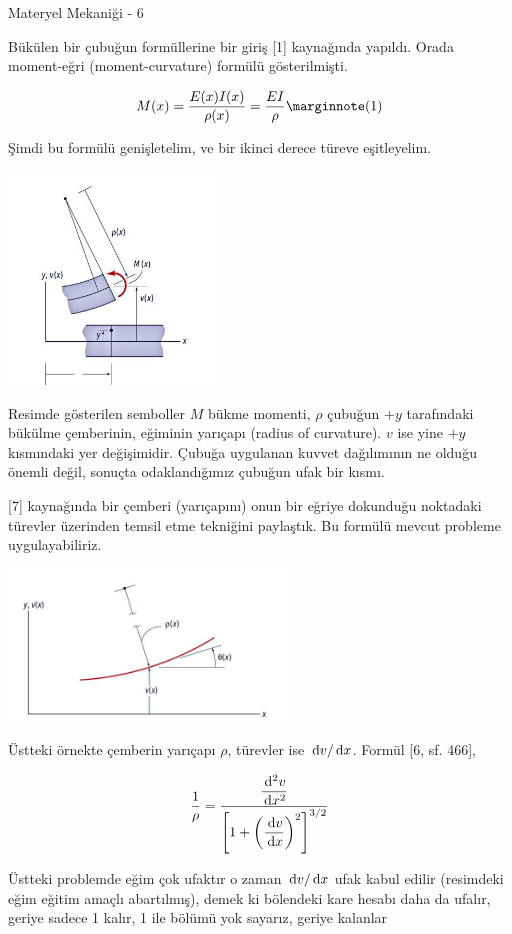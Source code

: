 \documentclass[12pt,fleqn]{article}\usepackage{../../common}
\begin{document}
Materyel Mekaniği - 6

Bükülen bir çubuğun formüllerine bir giriş [1] kaynağında yapıldı. Orada
moment-eğri (moment-curvature) formülü gösterilmişti.

$$
M(x) = \frac{E(x)I(x)}{\rho(x)} = \frac{EI}{\rho}
\mlabel{1}
$$

Şimdi bu formülü genişletelim, ve bir ikinci derece türeve eşitleyelim.

\includegraphics[width=15em]{phy_020_strs_05_01.jpg}

Resimde gösterilen semboller $M$ bükme momenti, $\rho$ çubuğun $+y$ tarafındaki
bükülme çemberinin, eğiminin yarıçapı (radius of curvature).  $v$ ise yine $+y$
kısmındaki yer değişimidir. Çubuğa uygulanan kuvvet dağılımının ne olduğu
önemli değil, sonuçta odaklandığımız çubuğun ufak bir kısmı.

[7] kaynağında bir çemberi (yarıçapını) onun bir eğriye dokunduğu noktadaki
türevler üzerinden temsil etme tekniğini paylaştık. Bu formülü mevcut probleme
uygulayabiliriz.

\includegraphics[width=20em]{phy_020_strs_05_02.jpg}

Üstteki örnekte çemberin yarıçapı $\rho$, türevler ise $\,\mathrm{d} v / \,\mathrm{d} x$.
Formül [6, sf. 466],

$$
\frac{1}{\rho} =
\frac
{\dfrac{\,\mathrm{d}^2 v}{\,\mathrm{d} x^2}}
{ \left[ 1 + \left( \dfrac{\,\mathrm{d} v}{\,\mathrm{d} x}  \right)^2 \right]^{3/2} }
$$

Üstteki problemde eğim çok ufaktır o zaman $\,\mathrm{d} v / \,\mathrm{d} x$ ufak kabul edilir
(resimdeki eğim eğitim amaçlı abartılmış), demek ki bölendeki kare hesabı
daha da ufalır, geriye sadece 1 kalır, 1 ile bölümü yok sayarız, geriye kalanlar
\end{document}
